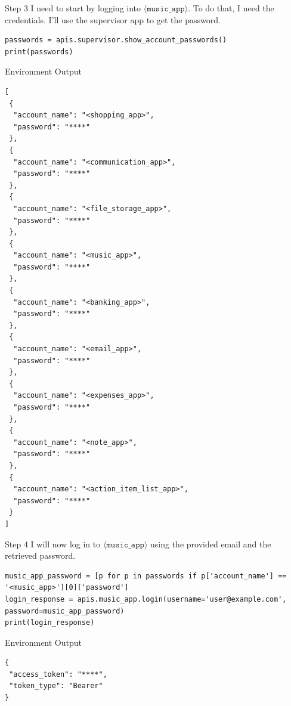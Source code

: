 \begin{center}
\begin{agentbox}{Step 3}
I need to start by logging into $\langle\mathtt{music\_app}\rangle$. To do that, I need the credentials. I'll use the supervisor app to get the password.
\begin{Verbatim}[fontsize=\scriptsize, breaklines, breakanywhere]
passwords = apis.supervisor.show_account_passwords()
print(passwords)
\end{Verbatim}
\end{agentbox}
\begin{envbox}{Environment Output}
\begin{Verbatim}[fontsize=\scriptsize, breaklines, breakanywhere]
[
 {
  "account_name": "<shopping_app>",
  "password": "****"
 },
 {
  "account_name": "<communication_app>",
  "password": "****"
 },
 {
  "account_name": "<file_storage_app>",
  "password": "****"
 },
 {
  "account_name": "<music_app>",
  "password": "****"
 },
 {
  "account_name": "<banking_app>",
  "password": "****"
 },
 {
  "account_name": "<email_app>",
  "password": "****"
 },
 {
  "account_name": "<expenses_app>",
  "password": "****"
 },
 {
  "account_name": "<note_app>",
  "password": "****"
 },
 {
  "account_name": "<action_item_list_app>",
  "password": "****"
 }
]

\end{Verbatim}
\end{envbox}

\begin{agentbox}{Step 4}
I will now log in to $\langle\mathtt{music\_app}\rangle$ using the provided email and the retrieved password.
\begin{Verbatim}[fontsize=\scriptsize, breaklines, breakanywhere]
music_app_password = [p for p in passwords if p['account_name'] == '<music_app>'][0]['password']
login_response = apis.music_app.login(username='user@example.com', password=music_app_password)
print(login_response)
\end{Verbatim}
\end{agentbox}
\begin{envbox}{Environment Output}
\begin{Verbatim}[fontsize=\scriptsize, breaklines, breakanywhere]
{
 "access_token": "****",
 "token_type": "Bearer"
}

\end{Verbatim}
\end{envbox}


\end{center}
